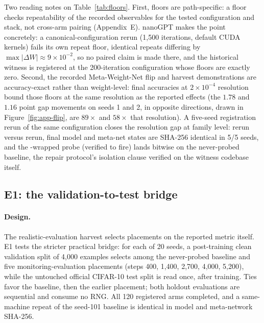 Two reading notes on Table~\ref{tab:floors}. First, floors are
path-specific: a floor checks repeatability of the recorded observables
for the tested configuration and stack, not cross-arm pairing
(Appendix~E). nanoGPT makes the point concretely: a
canonical-configuration rerun (1{,}500 iterations, default CUDA kernels)
fails its own repeat floor, identical repeats differing by
$\max|\Delta W| \approx 9{\times}10^{-2}$, so no paired claim is made
there, and the historical witness is registered at the 200-iteration configuration
whose floors are exactly zero. Second, the recorded Meta-Weight-Net flip
and harvest demonstrations are accuracy-exact rather than weight-level:
final accuracies at $2{\times}10^{-4}$ resolution bound those floors at
the same resolution as the reported effects (the $1.78$ and $1.16$ point
gap movements on seeds 1 and 2, in opposite directions, drawn in
Figure~\ref{fig:app-flip}, are $89\times$ and $58\times$ that resolution). A five-seed registration rerun of the
same configuration closes the resolution gap at family level: rerun
versus rerun, final model and meta-net states are SHA-256 identical in
5/5 seeds, and the -wrapped probe (verified to fire)
lands bitwise on the never-probed baseline, the repair protocol's
isolation clause verified on the witness codebase itself.

\subsection{E1: the validation-to-test bridge}
\label{sec:e1-bridge}

\paragraph{Design.}
The realistic-evaluation harvest selects placements on the reported metric
itself. E1 tests the stricter practical bridge: for each of 20 seeds, a
post-training clean validation split of 4{,}000 examples selects among the
never-probed baseline and five monitoring-evaluation placements (steps
400, 1{,}400, 2{,}700, 4{,}000, 5{,}200), while the untouched official
CIFAR-10 test split is read once, after training. Ties favor the baseline,
then the earlier placement; both holdout evaluations are sequential and
consume no RNG. All 120 registered arms completed, and a same-machine
repeat of the seed-101 baseline is identical in model and meta-network
SHA-256.

